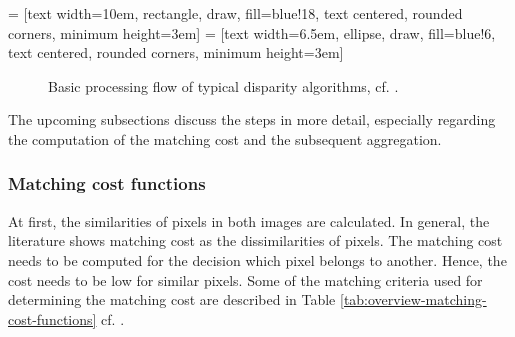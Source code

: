  = [text width=10em, rectangle, draw, fill=blue!18, text centered, rounded corners, minimum height=3em]
 = [text width=6.5em, ellipse, draw, fill=blue!6, text centered, rounded corners, minimum height=3em]
\begin{figure}[h!]
  \centering
  \caption[Basic processing flow of typical disparity algorithms]{Basic processing flow of typical disparity algorithms, cf. \citep{cyganek2011introduction, scharstein2002taxonomy}.}
  \label{fig:disparity-flow}
\end{figure}

\noindent The upcoming subsections discuss the steps in more detail, especially regarding the computation of the matching cost and the subsequent aggregation.

\newpage

\subsubsection{Matching cost functions}

At first, the similarities of pixels in both images are calculated.
In general, the literature shows matching cost as the dissimilarities of pixels.
The matching cost needs to be computed for the decision which pixel belongs to another.
Hence, the cost needs to be low for similar pixels.
Some of the matching criteria used for determining the matching cost are described in Table \ref{tab:overview-matching-cost-functions} cf. \citep{cyganek2011introduction, scharstein2002taxonomy, opencv_library, kanade1995development, hamzah2010sum}.

